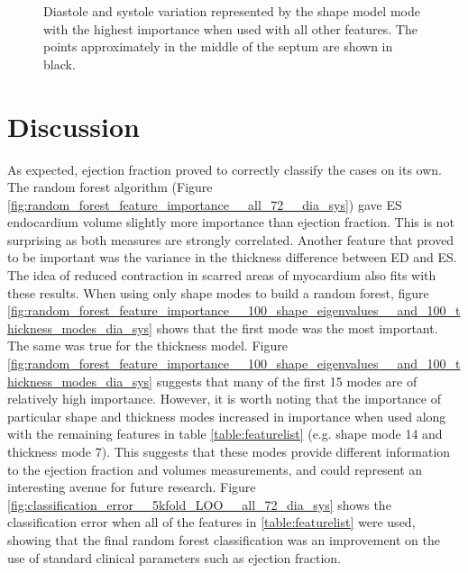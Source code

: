 \documentclass{llncs}
\begin{document}
	\begin{figure}[]			
\begin{center}   
\caption{ Diastole and systole variation represented by the shape model mode with the highest importance when used with all other features. The points approximately in the middle of the septum are shown in black. }
\label{fig:visualise_shapes}
\end{center}

		\end{figure}
	
		
  
 		
		
\section{Discussion}
As expected, ejection fraction proved to correctly classify the cases on its own. The random forest algorithm (Figure \ref{fig:random_forest_feature_importance__all_72__dia_sys}) gave ES endocardium volume slightly more importance than ejection fraction. This is not surprising as both measures are strongly correlated. Another feature that proved to be important was the variance in the thickness difference between ED and ES. The idea of reduced contraction in scarred areas of myocardium also fits with these results.
When using only shape modes to build a random forest, figure     \ref{fig:random_forest_feature_importance__100_shape_eigenvalues__and_100_thickness_modes_dia_sys} shows that the first mode was the most important. The same was true for the thickness model. Figure \ref{fig:random_forest_feature_importance__100_shape_eigenvalues__and_100_thickness_modes_dia_sys} suggests that many of the first 15 modes are of relatively high importance. 
However, it is worth noting that the importance of particular shape and thickness modes increased in importance when used along with the remaining features in table \ref{table:featurelist} (e.g. shape mode 14 and thickness mode 7). This suggests that these modes provide different information to the ejection fraction and volumes measurements, and could represent an interesting avenue for future research.
Figure \ref{fig:classification_error__5kfold_LOO__all_72_dia_sys} shows the classification error when all of the features in \ref{table:featurelist} were used, showing that the final random forest classification was an improvement on the use of standard clinical parameters such as ejection fraction.
\end{document}
